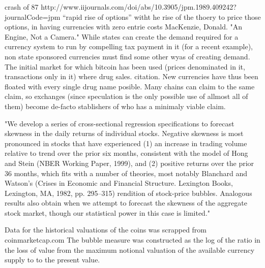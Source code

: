 crash of 87 http://www.iijournals.com/doi/abs/10.3905/jpm.1989.409242?journalCode=jpm “rapid rise of options” witht he rise of the thoery to price those options, in having currencies with zero entrie costs
MacKenzie, Donald. "An Engine, Not a Camera."
While states can create the demand required for a currency system to run by compelling tax payment in it (for a recent example), non state sponsored currencies must find some other wyas of creating demand.
The initial market for which bitcoin has been used (prices denominated in it, transactions only in it) where drug sales. citation.
New currencies have thus been floated with every single drug name posible. Many chains can claim to the same claim, so exchanges (since speculation is the only possible use of allmost all of them) become de-facto stablishers of who has a minimaly viable claim. 


"We develop a series of cross-sectional regression specifications to forecast skewness in the daily returns of individual stocks. Negative skewness is most pronounced in stocks that have experienced (1) an increase in trading volume relative to trend over the prior six months, consistent with the model of Hong and Stein (NBER Working Paper, 1999), and (2) positive returns over the prior 36 months, which fits with a number of theories, most notably Blanchard and Watson's (Crises in Economic and Financial Structure. Lexington Books, Lexington, MA, 1982, pp. 295–315) rendition of stock-price bubbles. Analogous results also obtain when we attempt to forecast the skewness of the aggregate stock market, though our statistical power in this case is limited."






Data for the historical valuations of the coins was scrapped from coinmarketcap.com The bubble measure was constructed as the log of the ratio in the loss of value from the maximum notional valuation of the available currency supply to to the present value. 

